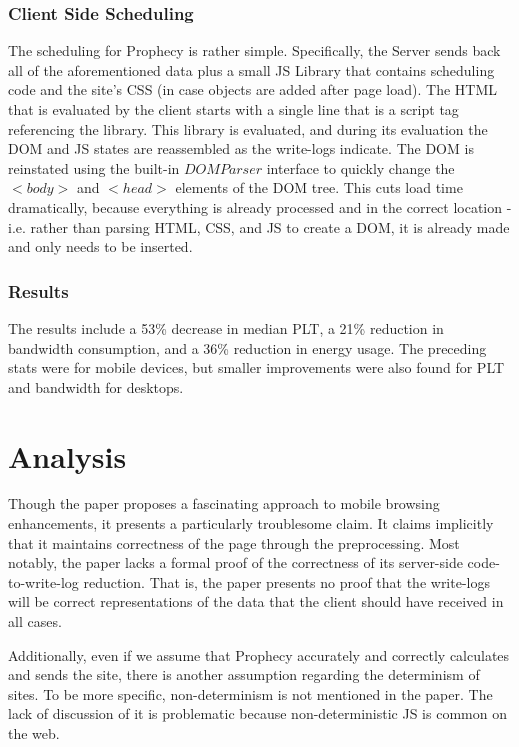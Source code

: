 \documentclass[10pt,letterpaper]{article}
\begin{document}
\begin{multicols*}{2}[]
        \subsubsection{Client Side Scheduling}
        The scheduling for Prophecy is rather simple. Specifically, the Server sends back all of the aforementioned data plus a small JS Library that contains scheduling code and the site's CSS (in case objects are added after page load). The HTML that is evaluated by the client starts with a single line that is a script tag referencing the library. This library is evaluated, and during its evaluation the DOM and JS states are reassembled as the write-logs indicate. The DOM is reinstated using the built-in $DOMParser$ interface to quickly change the $<body>$ and $<head>$ elements of the DOM tree. This cuts load time dramatically, because everything is already processed and in the correct location - i.e. rather than parsing HTML, CSS, and JS to create a DOM, it is already made and only needs to be inserted.  
        \subsubsection{Results}

        The results include a 53\% decrease in median PLT, a 21\% reduction in bandwidth consumption, and a 36\% reduction in energy usage. The preceding stats were for mobile devices, but smaller improvements were also found for PLT and bandwidth for desktops. 
        
        \section{Analysis}
            Though the paper proposes a fascinating approach to mobile browsing enhancements, it presents a particularly troublesome claim. It claims implicitly that it maintains correctness of the page through the preprocessing. Most notably, the paper lacks a formal proof of the correctness of its server-side code-to-write-log reduction. That is, the paper presents no proof that the write-logs will be correct representations of the data that the client should have received in all cases.
            
            Additionally, even if we assume that Prophecy accurately and correctly calculates and sends the site, there is another assumption regarding the determinism of sites. To be more specific, non-determinism is not mentioned in the paper. The lack of discussion of it is problematic because non-deterministic JS is common on the web. 
            

\end{multicols*}
\end{document}

